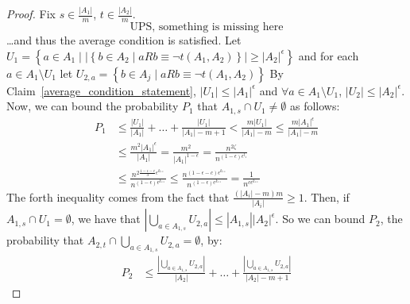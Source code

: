         \begin{proof}
            Fix $s \in \frac{|A_1|}{m}$, $t \in \frac{|A_2|}{m}$.
            \[
                \text{UPS, something is missing here}
            \]
            \dots and thus the average condition is satisfied.
            Let $U_1 = \left\{ a \in A_1 \mid |\left\{ b \in A_2 \mid a R b \equiv \neg t(A_1, A_2) \right\}| \geq |A_2|^\epsilon \right\}$
                and for each $a \in A_1 \setminus U_1$ let $U_{2,a} = \left\{ b \in A_j \mid a R b \equiv \neg t(A_1, A_2) \right\}$
            By Claim~\ref{average_condition_statement}, $|U_1| \leq |A_1|^\epsilon$ and $\forall a \in A_1 \setminus U_1$,
                $|U_2| \leq |A_2|^\epsilon$.
            Now, we can bound the probability $P_1$ that $A_{1,s} \cap U_1 \neq \emptyset$ as follows:
            \[
                \begin{split}
                    P_1
                        & \leq \frac{|U_1|}{|A_1|} + \dots + \frac{|U_1|}{|A_1|-m+1}
                            < \frac{m |U_1|}{|A_1| - m}
                            \leq \frac{m |A_1|^\epsilon}{|A_1| - m} \\
                        & \leq \frac{m^2 |A_1|^\epsilon}{|A_1|}
                            = \frac{m^2}{|A_1|^{1-\epsilon}}
                            = \frac{n^{2 \zeta}}{n^{(1-\epsilon)\epsilon^{l_1}}} \\ %
                        & \leq \frac{n^{2\frac{1-\epsilon-c}{3} \epsilon^{k_{**}}}}{n^{(1-\epsilon)\epsilon^{k_{**}}}}
                            \leq \frac{n^{(1-\epsilon-c) \epsilon^{k_{**}}}}{n^{(1-\epsilon)\epsilon^{k_{**}}}}
                            = \frac{1}{n^{c \epsilon^{k_{**}}}}
                \end{split}
            \]
            The forth inequality comes from the fact that $\frac{(|A_i| - m) m}{|A_i|} \geq 1$.
            Then, if $A_{1,s} \cap U_1= \emptyset$, we have that $|\bigcup_{a \in A_{1,s}} U_{2,a}| \leq |A_{1,s}| |A_2|^\epsilon$.
            So we can bound $P_2$, the probability that $A_{2,t} \cap \bigcup_{a \in A_{1,s}} U_{2,a} = \emptyset$, by:
            \[
                \begin{split}
                    P_2
                        & \leq \frac{|\bigcup_{a \in A_{1,s}} U_{2,a}|}{|A_2|} + \dots + \frac{|\bigcup_{a \in A_{1,s}} U_{2,a}|}{|A_2|-m+1}

\end{split}\]
\end{proof}
